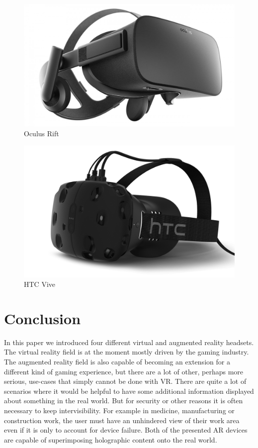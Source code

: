 \documentclass[11pt, a4paper]{IEEEtran}
\begin{document}
\begin{figure}[ht]
\caption{Oculus Rift}
\label{fig:oculus}
\includegraphics[width=\columnwidth]{images/oculusrift}
\end{figure}


\begin{figure}[ht]
\caption{HTC Vive}
\label{fig:htc}
\includegraphics[width=\columnwidth]{images/htcvive}
\end{figure}

\section{Conclusion}\label{sec:end}
In this paper we introduced four different virtual and augmented reality headsets. The virtual reality field is at the moment mostly driven by the gaming industry. The augmented reality field is also capable of becoming an extension for a different kind of gaming experience, but there are a lot of other, perhaps more serious, use-cases that simply cannot be done with VR. There are quite a lot of scenarios where it would be helpful to have some additional information displayed about something in the real world. But for security or other reasons it is often necessary to keep intervisibility. For example in medicine, manufacturing or construction work, the user must have an unhindered view of their work area even if it is only to account for device failure. 
Both of the presented AR devices are capable of superimposing holographic content onto the real world. 
\end{document}
